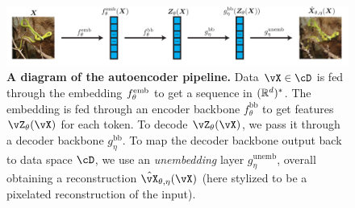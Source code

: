 \documentclass[../../book-main.tex]{subfiles}
\begin{document}
\begin{figure}
    \includegraphics[width=\textwidth]{chapters/chapter7/figs/autoencoder_pipeline.pdf}
    \caption{\small\textbf{A diagram of the autoencoder pipeline.} Data \(\vX \in \cD\) is fed through the embedding \(f_{\theta}^{\mathrm{emb}}\) to get a sequence in \((\mathbb{R}^{d})^{*}\). The embedding is fed through an encoder backbone \(f_{\theta}^{\mathrm{bb}}\) to get features \(\vZ_{\theta}(\vX)\) for each token. To decode \(\vZ_{\theta}(\vX)\), we pass it through a decoder backbone \(g_{\eta}^{\mathrm{bb}}\). To map the decoder backbone output back to data space \(\cD\), we use an \textit{unembedding} layer \(g_{\eta}^{\mathrm{unemb}}\), overall obtaining a reconstruction \(\hat{\vX}_{\theta, \eta}(\vX)\) (here stylized to be a pixelated reconstruction of the input).}
    \label{fig:overall_autoencoder_pipeline}
\end{figure}
\end{document}
